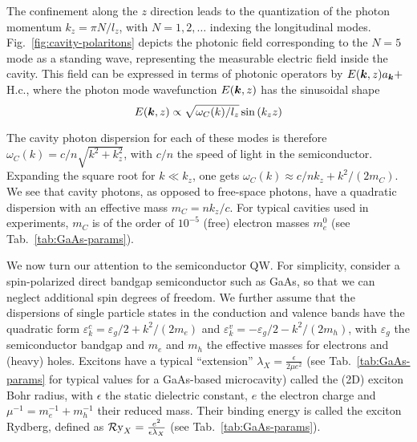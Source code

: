 The confinement along the $z$ direction leads to the quantization of
the photon momentum $k_z = \pi N/l_z$, with $N = 1,2,\dots$ indexing
the longitudinal modes. Fig.~\ref{fig:cavity-polaritons} depicts the
photonic field corresponding to the $N = 5$ mode as a standing wave,
representing the measurable electric field inside the cavity. This
field can be expressed in terms of photonic operators by
$E(\bm{k},z)a_{\bm{k}} +$ H.c., where the photon mode wavefunction
$E(\bm{k},z)$ has the sinusoidal shape~\cite{9780199228942}
%
\begin{equation}\label{eq:electric-field}
  E(\bm{k},z) \propto \sqrt{\omega_C(k)/l_z} \sin \left(k_z z\right)
\end{equation}
% 


The cavity photon dispersion for each of these modes is therefore
$\omega_C(k) = c/n \sqrt{k^2 + k_z^2}$, with $c/n$ the speed of light
in the semiconductor. Expanding the square root for $k \ll k_z$, one
gets $\omega_C(k) \approx c/n k_z + k^2/(2m_{C})$. We see that cavity
photons, as opposed to free-space photons, have a quadratic dispersion
with an effective mass $m_C = nk_z/c$. For typical cavities used in
experiments, $m_{C}$ is of the order of $10^{-5}$ (free) electron
masses $m_e^0$ (see Tab.~\ref{tab:GaAs-params}).

We now turn our attention to the semiconductor QW. For simplicity,
consider a spin-polarized direct bandgap semiconductor such as GaAs,
so that we can neglect additional spin degrees of freedom. We further
assume that the dispersions of single particle states in the
conduction and valence bands have the quadratic form
$\varepsilon^c_{k} = \varepsilon_g/2 + k^2/(2m_e)$ and
$\varepsilon^v_{k} = - \varepsilon_g/2 - k^2/(2m_h)$, with
$\varepsilon_g$ the semiconductor bandgap and $m_e$ and $m_h$ the
effective masses for electrons and (heavy) holes. Excitons have a
typical ``extension'' $\lambda_X = \frac{\epsilon}{2\mu e^2}$ (see
Tab.~\ref{tab:GaAs-params} for typical values for a GaAs-based
microcavity) called the (2D) exciton Bohr radius, with $\epsilon$ the
static dielectric constant, $e$ the electron charge and
$\mu^{-1} = m_e^{-1} + m_h^{-1}$ their reduced mass. Their binding
energy is called the exciton Rydberg, defined as
$\operatorname{\mathcal{R}y}_X = \frac{e^2}{\epsilon \lambda_X}$ (see
Tab.~\ref{tab:GaAs-params}).

